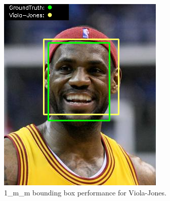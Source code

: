 \documentclass{l4proj}
\begin{document}
\begin{appendices}
\begin{figure}[h!]
\begin{minipage}{0.49\textwidth}
     \includegraphics[width=\textwidth]{images/appendix/viola/1.png}
    \caption{1\_m\_m bounding box performance for Viola-Jones.}
    \label{whoopi_result}
  \end{minipage}
\end{figure}


\end{appendices}
\end{document}
